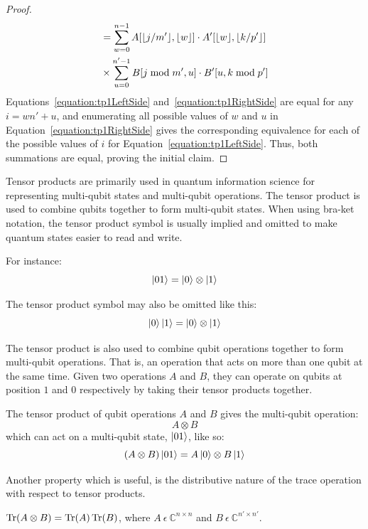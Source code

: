 \begin{proof}
\begin{align}
\begin{split}
&=\sum_{w=0}^{n-1} A[\lfloor j/m'\rfloor,\lfloor w\rfloor] \cdot A'[\lfloor w\rfloor,\lfloor k / p'\rfloor]\\
&\times \sum_{u=0}^{n'-1}  B[j \bmod m',u] \cdot B'[u,k \bmod p'] \\ \label{equation:tp1RightSide}
\end{split}
\end{align}
Equations~\eqref{equation:tp1LeftSide} and~\eqref{equation:tp1RightSide} are equal for any $i = wn'+u$, and enumerating all possible values of $w$ and $u$ in Equation~\eqref{equation:tp1RightSide} gives the corresponding equivalence for each of the possible values of $i$ for Equation~\eqref{equation:tp1LeftSide}. Thus, both summations are equal, proving the initial claim.
\end{proof}

Tensor products are primarily used in quantum information science for representing multi-qubit states and multi-qubit operations. The tensor product is used to combine qubits together to form multi-qubit states. When using bra-ket notation, the tensor product symbol is usually implied and omitted to make quantum states easier to read and write.
\begin{example}
For instance:
$$\Ket{01} = \Ket{0} \otimes \Ket{1}$$
\end{example}
\begin{example}
The tensor product symbol may also be omitted like this:
$$\Ket{0}\Ket{1} = \Ket{0} \otimes \Ket{1}$$
\end{example}
The tensor product is also used to combine qubit operations together to form multi-qubit operations. That is, an operation that acts on more than one qubit at the same time. Given two operations $A$ and $B$, they can operate on qubits at position $1$ and $0$ respectively by taking their tensor products together.
\begin{example}
The tensor product of qubit operations $A$ and $B$ gives the multi-qubit operation:
$$A \otimes B$$
which can act on a multi-qubit state, $\Ket{01}$, like so:
$$(A \otimes B)\Ket{01} = A\Ket{0} \otimes B\Ket{1}$$
\end{example}
Another property which is useful, is the distributive nature of the trace operation with respect to tensor products. 
\begin{theorem}
\label{theorem:traceTensorDistribute}
$\operatorname{Tr}(A \otimes B) = \operatorname{Tr}(A)\operatorname{Tr}(B)$, where $A \ \epsilon \ \mathbb{C}^{n \times n}$ and $B \ \epsilon \ \mathbb{C}^{n' \times n'}$.
\end{theorem}
